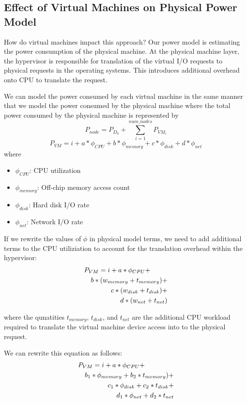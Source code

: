 \documentclass[times, 10pt,twocolumn]{article}
\begin{document}
\subsection{Effect of Virtual Machines on Physical Power Model}
\label{sec:powervirtual}
How do virtual machines impact this approach?  Our power model is estimating
the power consumption of the physical machine.  At the physical machine layer,
the hypervisor is responsible for translation of the virtual I/O requests to
physical requests in the operating systems.  This introduces additional
overhead onto CPU to translate the request. 

We can model the power consumed by each virtual machine in the same manner
that we model the power consumed by the physical machine where the total
power consumed by the physical machine is represented by 
\begin{equation*}
  P_{node}=P_{D_{0}}+\sum_{i=1}^{num\_nodes}P_{VM_{i}}
\end{equation*}
\begin{equation*}
  P_{VM}= i + a*\phi_{CPU} + b*\phi_{memory}+c*\phi_{disk}+d*\phi_{net}
\end{equation*}
where
\begin{itemize}
\item $\phi_{CPU}$: CPU utilization
\item $\phi_{memory}$: Off-chip memory access count
\item $\phi_{disk}$: Hard disk I/O rate
\item $\phi_{net}$: Network I/O rate
\end{itemize}
If we rewrite the values of $\phi$ in physical model terms, we need to add
additional terms to the CPU utiliziation to account for the translation
overhead within the hypervisor:
\begin{eqnarray*}
\lefteqn{P_{VM} = i + a*\phi_{CPU}+}\\
& &b*(w_{memory}+t_{memory})+\\
& &c*(w_{disk}+t_{disk})+\\
& &d*(w_{net}+t_{net})
\end{eqnarray*}

where the qunatities $t_{memory}$, $t_{disk}$, and $t_{net}$ are the
additional CPU workload required to translate the virtual machine device
access into to the physical request.

We can rewrite this equation as follows:
\begin{eqnarray*}
\lefteqn{P_{VM}= i + a*\phi_{CPU}+}\\
& &b_{1}*\phi_{memory}+b_{2}*t_{memory})+\\
& &c_{1}*\phi_{disk}+c_{2}*t_{disk}+\\
& &d_{1}*\phi_{net}+d_{2}*t_{net}
\end{eqnarray*}
\end{document}
